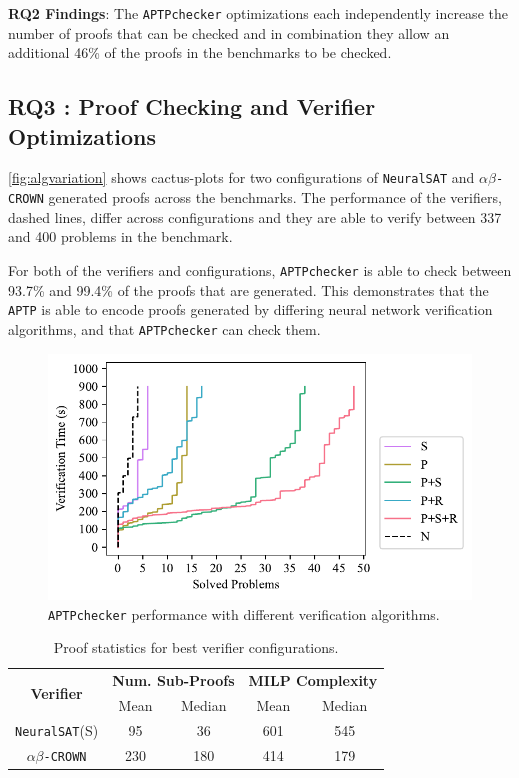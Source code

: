 \documentclass[oneside,11pt,dvipsnames]{book}
\newcommand{\ignore}[1]{}
\newcommand{\nnproofchecker}{\texttt{APTPchecker}}
\newcommand{\nnproofformat}{\texttt{APTP}}
\newcommand{\crown}{\texttt{$\alpha\beta$-CROWN}}
\newcommand{\neuralsat}{\texttt{NeuralSAT}}
\begin{document}
\begin{tcolorbox}[left=1pt,right=1pt,top=1pt,bottom=1pt]
\textbf{RQ2 Findings}: The \nnproofchecker{} optimizations each independently increase the number of proofs that can be checked and in combination they allow
an additional 46\% of the proofs in the benchmarks to be checked.
\end{tcolorbox}

\subsection{RQ3 : Proof Checking and Verifier Optimizations}
\label{sec:rq3}
\autoref{fig:algvariation} shows cactus-plots for two configurations of \neuralsat{} and \crown{} generated proofs across the benchmarks.   The performance of the verifiers, dashed lines, differ across configurations and they are able to 
verify between 337 and 400 problems in the benchmark.
\ignore{Number of Verified/Proved problems
    + abcrown(babsr):   337/335 = 99.4%
    + abcrown:          368/366 = 99.4%
    + neuralsat(SX):    387/363 = 93.7%
    + neuralsat(S)(SX): 400/384 = 96%
}
For both of the verifiers and configurations,
\nnproofchecker{} is able to check between 93.7\% and 99.4\% of the proofs that are generated.
This demonstrates that the \nnproofformat{} is able to encode proofs
generated by differing neural network verification algorithms, and
that \nnproofchecker{} can check them.

\begin{figure}[t]
    \centering
    \includegraphics[width=0.8\linewidth]{figure/ablation.pdf}
    \caption{\nnproofchecker{} performance with different verification algorithms.}
    \label{fig:algvariation}
\end{figure}

\begin{table}[t]
    \caption{Proof statistics for best verifier configurations.}
    \label{tab:sizestats}
    \centering
    \begin{tabular}{c|cc|cc}
        \toprule
         \multirow{2}{*}{\textbf{Verifier}} & \multicolumn{2}{c}{\textbf{Num. Sub-Proofs}} & \multicolumn{2}{|c}{\textbf{MILP Complexity}}\\
         & Mean & Median & Mean & Median \\ 
         \midrule
         \neuralsat{}(S) & 95 & 36 & 601 & 545 \\ 
         \midrule
         \crown{} & 230 & 180 & 414 & 179\\
         \bottomrule
    \end{tabular}
\end{table}
\end{document}
